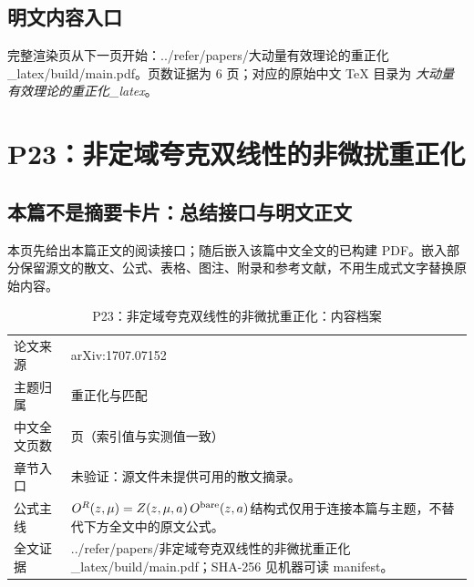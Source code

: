\documentclass[UTF8,11pt,oneside]{ctexbook}
\begin{document}
\section*{明文内容入口}
\noindent 完整渲染页从下一页开始：../\allowbreak{}refer/\allowbreak{}papers/\allowbreak{}大动量有效理论的重正化\_\allowbreak{}latex/\allowbreak{}build/\allowbreak{}main.pdf。页数证据为 6 页；对应的原始中文 TeX 目录为 \emph{大动量有效理论的重正化\_latex}。
\clearpage

\clearpage

\chapter{P23：非定域夸克双线性的非微扰重正化}
\section*{本篇不是摘要卡片：总结接口与明文正文}
本页先给出本篇正文的阅读接口；随后嵌入该篇中文全文的已构建 PDF。嵌入部分保留源文的散文、公式、表格、图注、附录和参考文献，不用生成式文字替换原始内容。
\begin{table}[htbp]
  \centering
  \caption{P23：非定域夸克双线性的非微扰重正化：内容档案}
  \small
  \begin{tabularx}{0.96\textwidth}{@{}p{3.3cm}>{\raggedright\arraybackslash}X@{}}
    \toprule
    论文来源 & arXiv:1707.07152 \\
    主题归属 & 重正化与匹配 \\
    中文全文页数 & 10 页（索引值与实测值一致） \\
    章节入口 & 未验证：源文件未提供可用的散文摘录。 \\
    公式主线 & $O^{R}(z,\mu)=Z(z,\mu,a)\,O^{\rm bare}(z,a)$\newline\scriptsize 结构式仅用于连接本篇与主题，不替代下方全文中的原文公式。 \\
    全文证据 & ../\allowbreak{}refer/\allowbreak{}papers/\allowbreak{}非定域夸克双线性的非微扰重正化\_\allowbreak{}latex/\allowbreak{}build/\allowbreak{}main.pdf；SHA-256 见机器可读 manifest。 \\
    \bottomrule
  \end{tabularx}
\end{table}
\end{document}
